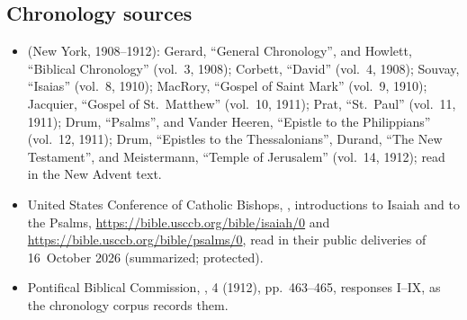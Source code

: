{\subsection*{Chronology sources}
\begin{itemize}[itemsep=0pt,topsep=.25em]
\item {} (New York, 1908--1912): Gerard, ``General Chronology'', and Howlett, ``Biblical Chronology'' (vol.~3, 1908); Corbett, ``David'' (vol.~4, 1908); Souvay, ``Isaias'' (vol.~8, 1910); MacRory, ``Gospel of Saint Mark'' (vol.~9, 1910); Jacquier, ``Gospel of St.~Matthew'' (vol.~10, 1911); Prat, ``St.~Paul'' (vol.~11, 1911); Drum, ``Psalms'', and Vander Heeren, ``Epistle to the Philippians'' (vol.~12, 1911); Drum, ``Epistles to the Thessalonians'', Durand, ``The New Testament'', and Meistermann, ``Temple of Jerusalem'' (vol.~14, 1912); read in the New Advent text.
\item United States Conference of Catholic Bishops, , introductions to Isaiah and to the Psalms, \url{https://bible.usccb.org/bible/isaiah/0} and \url{https://bible.usccb.org/bible/psalms/0}, read in their public deliveries of 16~October 2026 (summarized; protected).
\item Pontifical Biblical Commission, ,  4 (1912), pp.~463--465, responses I--IX, as the chronology corpus records them.
\end{itemize}
\par}
